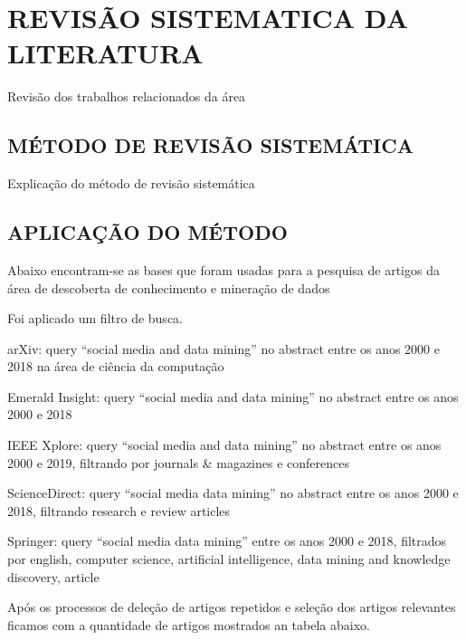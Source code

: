 
\chapter{REVISÃO SISTEMATICA DA LITERATURA}
\label{chap:revisaoSistematica}
Revisão dos trabalhos relacionados da área

\section{MÉTODO DE REVISÃO SISTEMÁTICA}
\label{sec:metodoRevisao}
Explicação do método de revisão sistemática

\section{APLICAÇÃO DO MÉTODO}
\label{sec:aplicacaoRevisao}
Abaixo encontram-se as bases que foram usadas para a pesquisa de artigos da área de descoberta de conhecimento e mineração de dados



Foi aplicado um filtro de busca.

arXiv: query ``social media and data mining'' no abstract entre os anos 2000 e 2018 na área de ciência da computação

Emerald Insight: query ``social media and data mining'' no abstract entre os anos 2000 e 2018

IEEE Xplore: query ``social media and data mining'' no abstract entre os anos 2000 e 2019, filtrando por journals \& magazines e conferences

ScienceDirect: query ``social media data mining'' no abstract entre os anos 2000 e 2018, filtrando research e review articles

Springer: query ``social media data mining'' entre os anos 2000 e 2018, filtrados por english, computer science, artificial intelligence, data mining and knowledge discovery, article



Após os processos de deleção de artigos repetidos e seleção dos artigos relevantes ficamos com a quantidade de artigos mostrados an tabela abaixo.


